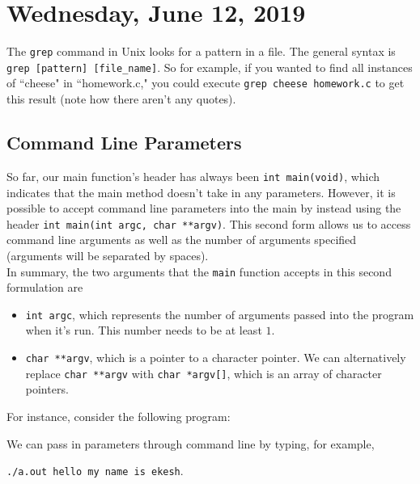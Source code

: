 \section{Wednesday, June 12, 2019}

The \verb!grep! command in Unix looks for a pattern in a file. The general syntax is \verb!grep [pattern] [file_name]!. So for example, if you wanted to find all instances of ``cheese" in ``homework.c," you could execute \verb!grep cheese homework.c! to get this result (note how there aren't any quotes). 

\subsection{Command Line Parameters}

So far, our main function's header has always been \texttt{int main(void)}, which indicates that the main method doesn't take in any parameters. However, it is possible to accept command line parameters into the main by instead using the header \texttt{int main(int argc, char **argv)}. This second form allows us to access command line arguments as well as the number of arguments specified (arguments will be separated by spaces). \\

In summary, the two arguments that the \texttt{main} function accepts in this second formulation are \begin{itemize}
    \item \texttt{int argc}, which represents the number of arguments passed into the program when it's run. This number needs to be at least $1$.
    \item \texttt{char **argv}, which is a pointer to a character pointer. We can alternatively replace \texttt{char **argv} with \texttt{char *argv[]}, which is an array of character pointers. 
\end{itemize}

For instance, consider the following program: 



\lstset{
caption=Command Line Parameters
}
\begin{center}
\label{Command Line Parameters}
\end{center}


We can pass in parameters through command line by typing, for example, 
\begin{center}
\texttt{./a.out hello my name is ekesh}. 
\end{center}


